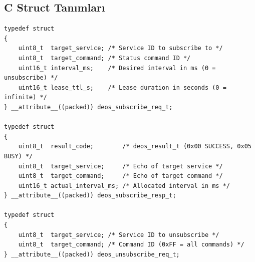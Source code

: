 \documentclass[a4paper,10pt]{article}
\begin{document}
\subsection{C Struct Tanımları}

\begin{lstlisting}[style=cstyle]
typedef struct
{
    uint8_t  target_service; /* Service ID to subscribe to */
    uint8_t  target_command; /* Status command ID */
    uint16_t interval_ms;    /* Desired interval in ms (0 = unsubscribe) */
    uint16_t lease_ttl_s;    /* Lease duration in seconds (0 = infinite) */
} __attribute__((packed)) deos_subscribe_req_t;

typedef struct
{
    uint8_t  result_code;        /* deos_result_t (0x00 SUCCESS, 0x05 BUSY) */
    uint8_t  target_service;     /* Echo of target service */
    uint8_t  target_command;     /* Echo of target command */
    uint16_t actual_interval_ms; /* Allocated interval in ms */
} __attribute__((packed)) deos_subscribe_resp_t;

typedef struct
{
    uint8_t  target_service; /* Service ID to unsubscribe */
    uint8_t  target_command; /* Command ID (0xFF = all commands) */
} __attribute__((packed)) deos_unsubscribe_req_t;
\end{lstlisting}
\end{document}
